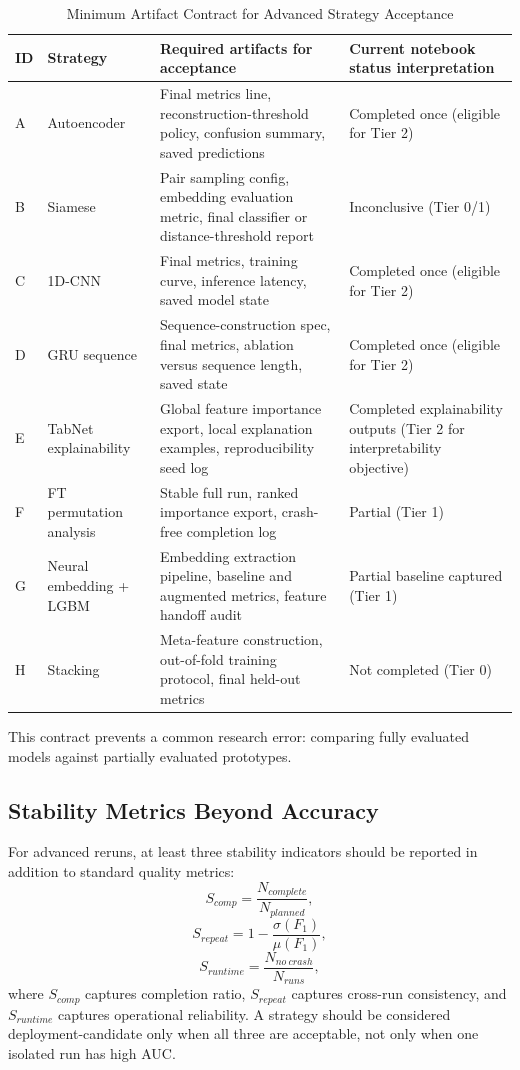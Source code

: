 \documentclass[10pt,journal]{IEEEtran}
\begin{document}
\begin{table}[!t]
\caption{Minimum Artifact Contract for Advanced Strategy Acceptance}
\label{tab:artifact_contract}
\centering
\begin{tabular}{p{1.0cm}p{2.6cm}p{4.8cm}p{5.0cm}}
\toprule
ID & Strategy & Required artifacts for acceptance & Current notebook status interpretation \\
\midrule
A & Autoencoder & Final metrics line, reconstruction-threshold policy, confusion summary, saved predictions & Completed once (eligible for Tier 2) \\
B & Siamese & Pair sampling config, embedding evaluation metric, final classifier or distance-threshold report & Inconclusive (Tier 0/1) \\
C & 1D-CNN & Final metrics, training curve, inference latency, saved model state & Completed once (eligible for Tier 2) \\
D & GRU sequence & Sequence-construction spec, final metrics, ablation versus sequence length, saved state & Completed once (eligible for Tier 2) \\
E & TabNet explainability & Global feature importance export, local explanation examples, reproducibility seed log & Completed explainability outputs (Tier 2 for interpretability objective) \\
F & FT permutation analysis & Stable full run, ranked importance export, crash-free completion log & Partial (Tier 1) \\
G & Neural embedding + LGBM & Embedding extraction pipeline, baseline and augmented metrics, feature handoff audit & Partial baseline captured (Tier 1) \\
H & Stacking & Meta-feature construction, out-of-fold training protocol, final held-out metrics & Not completed (Tier 0) \\
\bottomrule
\end{tabular}
\end{table}

This contract prevents a common research error: comparing fully evaluated models against partially evaluated prototypes.

\subsection{Stability Metrics Beyond Accuracy}
For advanced reruns, at least three stability indicators should be reported in addition to standard quality metrics:
\begin{equation}
S_{comp}=\frac{N_{complete}}{N_{planned}},
\end{equation}
\begin{equation}
S_{repeat}=1-\frac{\sigma(F_1)}{\mu(F_1)},
\end{equation}
\begin{equation}
S_{runtime}=\frac{N_{no\ crash}}{N_{runs}},
\end{equation}
where $S_{comp}$ captures completion ratio, $S_{repeat}$ captures cross-run consistency, and $S_{runtime}$ captures operational reliability. A strategy should be considered deployment-candidate only when all three are acceptable, not only when one isolated run has high AUC.
\end{document}
